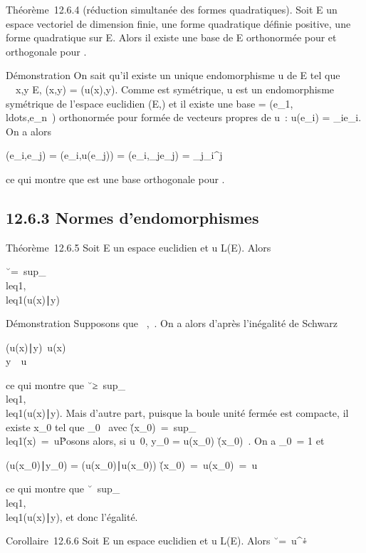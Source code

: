 \documentclass[]{article}
\begin{document}
Théorème~12.6.4 (réduction simultanée des formes quadratiques). Soit E
un ~ espace vectoriel de dimension finie, \Phi une forme quadratique
définie positive, \Psi une forme quadratique sur E. Alors il existe une
base  de E orthonormée pour \Phi et orthogonale pour \Psi.

Démonstration On sait qu'il existe un unique endomorphisme u de E tel
que \forall~~x,y \in E, \psi(x,y) = \phi(u(x),y). Comme \psi est
symétrique, u est un endomorphisme symétrique de l'espace euclidien
(E,\Phi) et il existe une base  =
(e_1,\\ldots,e_n~)
orthonormée pour \Phi formée de vecteurs propres de u~: u(e_i) =
\lambda_ie_i. On a alors

\psi(e_i,e_j) = \phi(e_i,u(e_j)) =
\phi(e_i,\lambda_je_j) =
\lambda_j\delta_i^j

ce qui montre que  est une base orthogonale pour \psi.

\subsection{12.6.3 Normes d'endomorphismes}

Théorème~12.6.5 Soit E un espace euclidien et u \in L(E). Alors

\u\
=\
sup_\x\\leq1,\y\(u(x)∣y)

Démonstration Supposons que
\x\ \leq
1,\y\ \leq 1. On a alors
d'après l'inégalité de Schwarz

(u(x)∣y)\leq\
u(x)\\y\
\leq\ u\

ce qui montre que \u\
≥\
sup_\x\\leq1,\y\\leq1(u(x)∣y).
Mais d'autre part, puisque la boule unité fermée est compacte, il existe
x_0 tel que
\x_0\ 
avec \u(x_0)\
=\
sup_\x\\leq1\u(x)\
=\ u\. Posons alors,
si u\neq~0, y_0 = u(x_0)
\over
\u(x_0)\ .
On a \y_0\ =
1 et

(u(x_0)∣y_0)
= (u(x_0)∣u(x_0))
\over
\u(x_0)\
=\ u(x_0)\
=\ u\

ce qui montre que \u\
\leq\
sup_\x\\leq1,\y\\leq1(u(x)∣y),
et donc l'égalité.

Corollaire~12.6.6 Soit E un espace euclidien et u \in L(E). Alors
\u\
=\ u^∗\.
\end{document}
